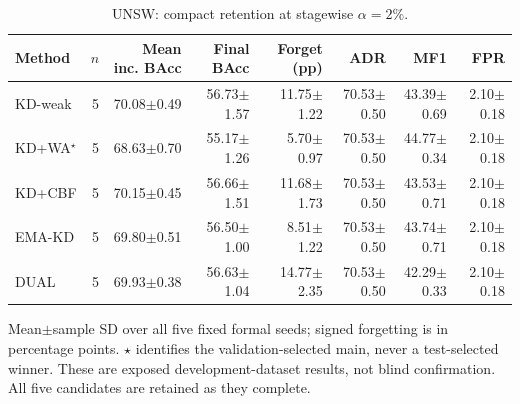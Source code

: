 \begin{table}[t]
\centering\scriptsize
\setlength{\tabcolsep}{3.3pt}
\caption{UNSW: compact retention at stagewise $\alpha=2\%$.}\label{tab:compact-results-unsw_nb15}
\begin{tabular}{lrrrrrrr}
\toprule
Method & $n$ & Mean inc. BAcc & Final BAcc & Forget (pp) & ADR & MF1 & FPR \\
\midrule
KD-weak & 5 & 70.08$\pm$0.49 & 56.73$\pm$1.57 & 11.75$\pm$1.22 & 70.53$\pm$0.50 & 43.39$\pm$0.69 & 2.10$\pm$0.18 \\
KD+WA$^\star$ & 5 & 68.63$\pm$0.70 & 55.17$\pm$1.26 & 5.70$\pm$0.97 & 70.53$\pm$0.50 & 44.77$\pm$0.34 & 2.10$\pm$0.18 \\
KD+CBF & 5 & 70.15$\pm$0.45 & 56.66$\pm$1.51 & 11.68$\pm$1.73 & 70.53$\pm$0.50 & 43.53$\pm$0.71 & 2.10$\pm$0.18 \\
EMA-KD & 5 & 69.80$\pm$0.51 & 56.50$\pm$1.00 & 8.51$\pm$1.22 & 70.53$\pm$0.50 & 43.74$\pm$0.71 & 2.10$\pm$0.18 \\
DUAL & 5 & 69.93$\pm$0.38 & 56.63$\pm$1.04 & 14.77$\pm$2.35 & 70.53$\pm$0.50 & 42.29$\pm$0.33 & 2.10$\pm$0.18 \\
\bottomrule
\end{tabular}
\par\smallskip\begin{minipage}{0.98\textwidth}\scriptsize Mean$\pm$sample SD over all five fixed formal seeds; signed forgetting is in percentage points. $\star$ identifies the validation-selected main, never a test-selected winner. These are exposed development-dataset results, not blind confirmation. All five candidates are retained as they complete.\end{minipage}
\end{table}

